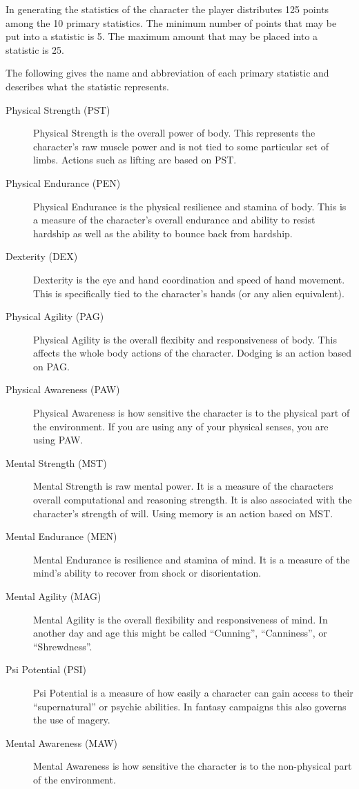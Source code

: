 In generating the statistics of the character the player distributes 
125 points among the 10 primary statistics. The minimum number of points that may be
put into a statistic is 5. The maximum amount that may be placed into
a statistic is 25.

The following gives the name and abbreviation of each primary statistic and
describes what the statistic represents.
\label{Desc:PrimaryStats}
\begin{description}
	\item[Physical Strength	(PST)]
	Physical Strength is the overall power of body. This represents
	the character's raw muscle power and is not tied to some particular
	set of limbs. Actions such as lifting are based on PST.
	\item[Physical Endurance (PEN)]
	Physical Endurance is the physical resilience and stamina of body.
	This is a measure of the character's overall endurance and ability
	to resist hardship as well as the ability to bounce back from hardship.
	\item[Dexterity	(DEX)]
	Dexterity is the eye and hand coordination and speed of hand movement.
	This is	specifically tied to the character's hands (or any alien 
	equivalent).
	\item[Physical Agility (PAG)]
	Physical Agility is the overall flexibity and responsiveness of body.
	This affects the whole body actions of the character. Dodging is 
	an action based on PAG.
	\item[Physical Awareness (PAW)]
	Physical Awareness is how sensitive the character is to
	the physical part of the environment. If you are using any of 
	your physical senses, you are using PAW.
	\item[Mental Strength (MST)]
	Mental Strength is raw mental power. It is a measure of the characters 
	overall computational and reasoning strength. It is also associated with
	the character's strength of will. Using memory is an action based 
	on MST.
	\item[Mental Endurance (MEN)]
	Mental Endurance is resilience and stamina of mind. It is a measure of the
	mind's ability to recover from shock or disorientation.
	\item[Mental Agility (MAG)]
	Mental Agility is the overall flexibility and responsiveness of mind.
	In another day and age this might be called ``Cunning'', 
	``Canniness'', or ``Shrewdness''.
	\item[Psi Potential (PSI)]
	Psi Potential is a measure of how easily a character can gain access to
	their ``supernatural'' or psychic abilities. In fantasy campaigns 
	this also governs the use of magery.
	\item[Mental Awareness (MAW)]
	Mental Awareness is how sensitive the character is to
	the non-physical part of the environment. 
\end{description}

